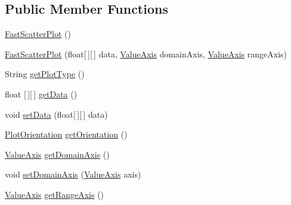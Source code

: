 \subsection*{Public Member Functions}
\begin{DoxyCompactItemize}
\item 
\mbox{\hyperlink{classorg_1_1jfree_1_1chart_1_1plot_1_1_fast_scatter_plot_ab2a02f57965e6ebf12924091a333c6cb}{Fast\+Scatter\+Plot}} ()
\item 
\mbox{\hyperlink{classorg_1_1jfree_1_1chart_1_1plot_1_1_fast_scatter_plot_a5999cacce7174d79a1867d82c6e390be}{Fast\+Scatter\+Plot}} (float\mbox{[}$\,$\mbox{]}\mbox{[}$\,$\mbox{]} data, \mbox{\hyperlink{classorg_1_1jfree_1_1chart_1_1axis_1_1_value_axis}{Value\+Axis}} domain\+Axis, \mbox{\hyperlink{classorg_1_1jfree_1_1chart_1_1axis_1_1_value_axis}{Value\+Axis}} range\+Axis)
\item 
String \mbox{\hyperlink{classorg_1_1jfree_1_1chart_1_1plot_1_1_fast_scatter_plot_a61cecc74546e831b852884d1d2e782a7}{get\+Plot\+Type}} ()
\item 
float \mbox{[}$\,$\mbox{]}\mbox{[}$\,$\mbox{]} \mbox{\hyperlink{classorg_1_1jfree_1_1chart_1_1plot_1_1_fast_scatter_plot_a0c23b75056c021aac92afb38266d906b}{get\+Data}} ()
\item 
void \mbox{\hyperlink{classorg_1_1jfree_1_1chart_1_1plot_1_1_fast_scatter_plot_ab952cb15304cfe4f550ed9a57134c752}{set\+Data}} (float\mbox{[}$\,$\mbox{]}\mbox{[}$\,$\mbox{]} data)
\item 
\mbox{\hyperlink{classorg_1_1jfree_1_1chart_1_1plot_1_1_plot_orientation}{Plot\+Orientation}} \mbox{\hyperlink{classorg_1_1jfree_1_1chart_1_1plot_1_1_fast_scatter_plot_af6a4373b3880bdd8c8e20d009c21c0fc}{get\+Orientation}} ()
\item 
\mbox{\hyperlink{classorg_1_1jfree_1_1chart_1_1axis_1_1_value_axis}{Value\+Axis}} \mbox{\hyperlink{classorg_1_1jfree_1_1chart_1_1plot_1_1_fast_scatter_plot_adce6bd628c2b1bc6a2ed816cbd63f769}{get\+Domain\+Axis}} ()
\item 
void \mbox{\hyperlink{classorg_1_1jfree_1_1chart_1_1plot_1_1_fast_scatter_plot_aea7696ebad4c4e6c9734dc5027633384}{set\+Domain\+Axis}} (\mbox{\hyperlink{classorg_1_1jfree_1_1chart_1_1axis_1_1_value_axis}{Value\+Axis}} axis)
\item 
\mbox{\hyperlink{classorg_1_1jfree_1_1chart_1_1axis_1_1_value_axis}{Value\+Axis}} \mbox{\hyperlink{classorg_1_1jfree_1_1chart_1_1plot_1_1_fast_scatter_plot_ad202f880b34e883d591b154e943177d0}{get\+Range\+Axis}} ()
\item 

\end{DoxyCompactItemize}
